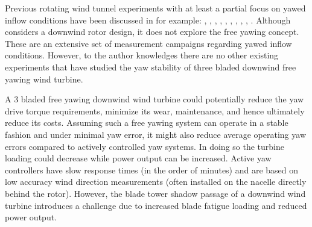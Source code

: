\documentclass[a4paper]{jpconf}
\begin{document}


Previous rotating wind tunnel experiments with at least a partial focus on yawed inflow conditions have been discussed in for example:
\cite{haans_measurement_2005}, \cite{haans_measurement_2005-1}, \cite{bracchi_downwind_2014}, \cite{schepers_engineering_2012}, \cite{schepers_final_2012}, \cite{mexnext_iea_web}, \cite{schepers_model_2007}, \cite{hand_unsteady_2001}, \cite{loland_wind_2011}, \cite{haans_wind_2011}.
Although \cite{bracchi_downwind_2014} considers a downwind rotor design, it does not explore the free yawing concept. These are an extensive set of measurement campaigns regarding yawed inflow conditions. However, to the author knowledges there are no other existing experiments that have studied the yaw stability of three bladed downwind free yawing wind turbine.

A 3 bladed free yawing downwind wind turbine could potentially reduce the yaw drive torque requirements, minimize its wear, maintenance, and hence ultimately reduce its costs. Assuming such a free yawing system can operate in a stable fashion and under minimal yaw error, it might also reduce average operating yaw errors compared to actively controlled yaw systems. In doing so the turbine loading could decrease while power output can be increased. Active yaw controllers have slow response times (in the order of minutes) and are based on low accuracy wind direction measurements (often installed on the nacelle directly behind the rotor). However, the blade tower shadow passage of a downwind wind turbine introduces a challenge due to increased blade fatigue loading and reduced power output.
\end{document}

